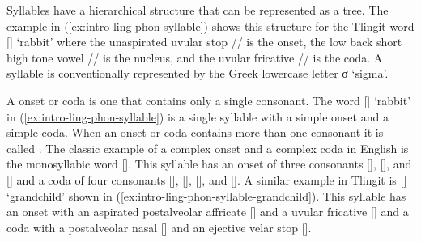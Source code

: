 Syllables have a hierarchical structure that can be represented as a tree. The example in (\ref{ex:intro-ling-phon-syllable}) shows this structure for the Tlingit word  [] ‘rabbit’ where the unaspirated uvular stop // is the onset, the low back short high tone vowel // is the nucleus, and the uvular fricative // is the coda. A syllable is conventionally represented by the Greek lowercase letter σ ‘sigma’.

\ex\label{ex:intro-ling-phon-syllable}%
%
\xe

A  onset or coda is one that contains only a single consonant. The word  [] ‘rabbit’ in (\ref{ex:intro-ling-phon-syllable}) is a single syllable with a simple onset and a simple coda. When an onset or coda contains more than one consonant it is called . The classic example of a complex onset and a complex coda in English is the monosyllabic word  []. This syllable has an onset of three consonants [], [], and [] and a coda of four consonants [], [], [], and []. A similar example in Tlingit is  [] ‘grandchild’ shown in (\ref{ex:intro-ling-phon-syllable-grandchild}). This syllable  has an onset with an aspirated postalveolar affricate [] and a uvular fricative [] and a coda with a postalveolar nasal [] and an ejective velar stop [].

